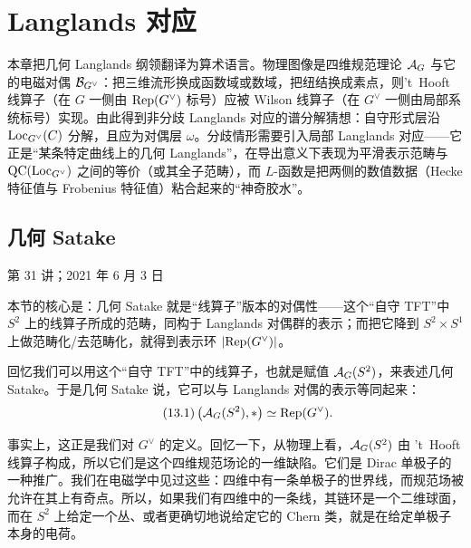 \chapter{Langlands 对应}\label{ch:13}

\begin{keytakeaways}
本章把几何 Langlands 纲领翻译为算术语言。物理图像是四维规范理论 $\mathcal{A}_G$ 与它的电磁对偶 $\mathcal{B}_{G^\vee}$：把三维流形换成函数域或数域，把纽结换成素点，则’t~Hooft 线算子（在 $G$ 一侧由 $\mathrm{Rep}(G^\vee)$ 标号）应被 Wilson 线算子（在 $G^\vee$ 一侧由局部系统标号）实现。由此得到非分歧 Langlands 对应的谱分解猜想：自守形式层沿 $\mathrm{Loc}_{G^\vee}(C)$ 分解，且应为对偶层 $\omega$。分歧情形需要引入局部 Langlands 对应——它正是“某条特定曲线上的几何 Langlands”，在导出意义下表现为平滑表示范畴与 $\mathrm{QC}(\mathrm{Loc}_{G^\vee})$ 之间的等价（或其全子范畴），而 $L$-函数是把两侧的数值数据（Hecke 特征值与 Frobenius 特征值）粘合起来的“神奇胶水”。
\end{keytakeaways}

\section{几何 Satake}\label{sec:13-1}

\begin{flushright}\small 第 31 讲；2021 年 6 月 3 日\end{flushright}

\begin{sectionkey}
本节的核心是：几何 Satake 就是“线算子”版本的对偶性——这个“自守 TFT”中 $S^2$ 上的线算子所成的范畴，同构于 Langlands 对偶群的表示；而把它降到 $S^2\times S^1$ 上做范畴化/去范畴化，就得到表示环 $|\mathrm{Rep}(G^\vee)|$。
\end{sectionkey}

回忆我们可以用这个“自守 TFT”中的线算子，也就是赋值 $\mathcal{A}_G(S^2)$，来表述几何 Satake。于是几何 Satake 说，它可以与 Langlands 对偶的表示等同起来：
\begin{equation}\tag{13.1}
\left(\mathcal{A}_G(S^2),*\right)\simeq \mathrm{Rep}(G^\vee).
\end{equation}

事实上，这正是我们对 $G^\vee$ 的定义。回忆一下，从物理上看，$\mathcal{A}_G(S^2)$ 由 't~Hooft 线算子构成，所以它们是这个四维规范场论的一维缺陷。它们是 Dirac 单极子的一种推广。我们在电磁学中见过这些：四维中有一条单极子的世界线，而规范场被允许在其上有奇点。所以，如果我们有四维中的一条线，其链环是一个二维球面，而在 $S^2$ 上给定一个丛、或者更确切地说给定它的 Chern 类，就是在给定单极子本身的电荷。

